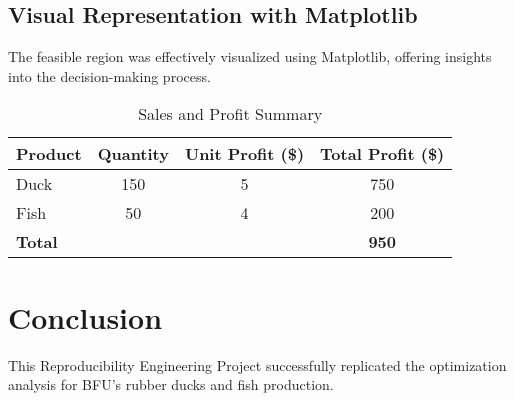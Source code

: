 \documentclass[sigconf, nonacm]{acmart}
\begin{document}
\subsection{Visual Representation with Matplotlib}
The feasible region was effectively visualized using Matplotlib, offering insights into the decision-making process.


\begin{table}[htbp]
  \centering
  \begin{tabular}{lccc}
    \toprule
    \textbf{Product} & \textbf{Quantity} & \textbf{Unit Profit (\$)} & \textbf{Total Profit (\$)} \\
    \midrule
    Duck & 150 & 5 & 750 \\
    Fish & 50 & 4 & 200 \\
    \midrule
    \textbf{Total} & & & \textbf{950} \\
    \bottomrule
  \end{tabular}
  \caption{Sales and Profit Summary}
  \label{tab:sales_profit_summary}
\end{table}

\section{Conclusion}

This Reproducibility Engineering Project successfully replicated the optimization analysis for BFU's rubber ducks and fish production. 




\end{document}
